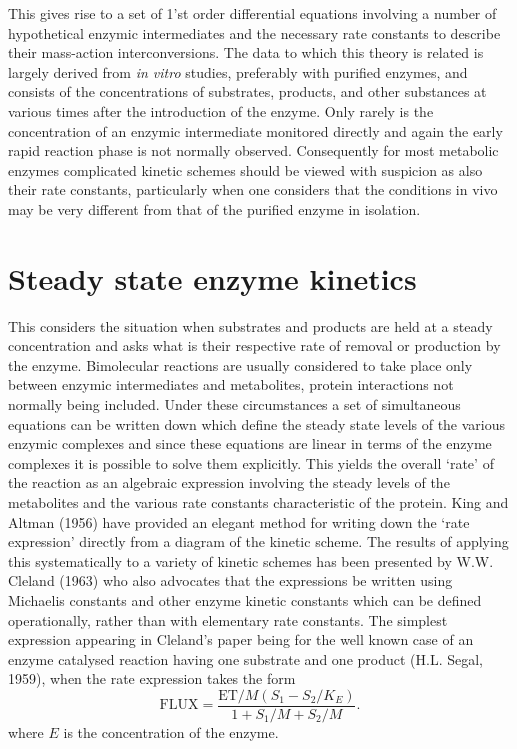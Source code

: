 This gives rise to a set of 1'st order differential equations involving a number of hypothetical enzymic intermediates and the necessary rate constants to describe their mass-action interconversions. The data to which this theory is related is largely derived from {\em in vitro} studies, preferably with purified enzymes, and consists of the concentrations of substrates, products, and other substances at various times after the introduction of the enzyme. Only rarely is the concentration of an enzymic intermediate monitored directly and again the early rapid reaction phase is not normally observed. Consequently for most metabolic enzymes complicated kinetic schemes should be viewed with suspicion as also their rate constants, particularly when one considers that the conditions in vivo may be very different from that of the purified enzyme in isolation.

\section{Steady state enzyme kinetics}

This considers the situation when substrates and products are held at a steady concentration and asks what is their respective rate of removal or production by the enzyme. Bimolecular reactions are usually considered to take place only between enzymic intermediates and metabolites, protein interactions not normally being included. Under these circumstances a set of simultaneous equations can be written down which define the steady state levels of the various enzymic complexes and since these equations are linear in terms of the enzyme complexes it is possible to solve them explicitly. This yields the overall `rate' of the reaction as an algebraic expression involving the steady levels of the metabolites and the various rate constants characteristic of the protein. King and Altman (1956) have provided an elegant method for writing down the `rate expression' directly from a diagram of the kinetic scheme. The results of applying this systematically to a variety of kinetic schemes has been presented by W.W. Cleland (1963) who also advocates that the expressions be written using Michaelis constants and other enzyme kinetic constants which can be defined operationally, rather than with elementary rate constants. The simplest expression appearing in Cleland's paper being for the well known case of an enzyme catalysed reaction having one substrate and one product (H.L. Segal, 1959), when the rate expression takes the form
%
$$
\mathrm{FLUX}=\frac{\mathrm{ET} / M\left(S_{1}-S_{2} / K_{E}\right)}{1+S_{1} / M+S_{2} / M}.
$$
%
where $E$ is the concentration of the enzyme.

